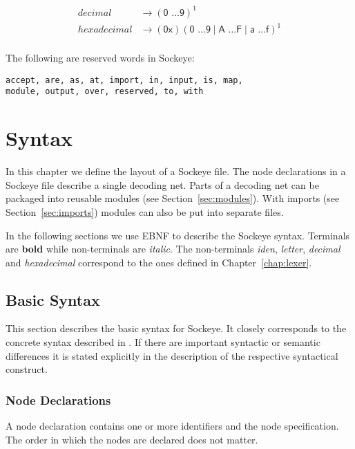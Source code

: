 \documentclass[a4paper,11pt,twoside]{report}
\begin{document}
{{{\begin{description}
\begin{align*}
decimal & \rightarrow (\textsf{0 \ldots 9})^{\textrm{1}}\\
hexadecimal & \rightarrow (\textsf{0x})(\textsf{0 \ldots 9} \mid \textsf{A \ldots F} \mid \textsf{a \ldots f})^{\textrm{1}}\\
\end{align*}

\item[Reserved words:] The following are reserved words in Sockeye:
\begin{verbatim}
accept, are, as, at, import, in, input, is, map,
module, output, over, reserved, to, with
\end{verbatim}

\end{description}


\chapter{Syntax}
\label{chap:declaration}

In this chapter we define the layout of a Sockeye file.
The node declarations in a Sockeye file describe a single decoding net.
Parts of a decoding net can be packaged into reusable modules (see Section~\ref{sec:modules}).
With imports (see Section~\ref{sec:imports}) modules can also be put into separate files.

In the following sections we use EBNF to describe the Sockeye syntax. Terminals are \textbf{bold} while non-terminals are \textit{italic}.
The non-terminals \textit{iden}, \textit{letter}, \textit{decimal} and \textit{hexadecimal} correspond to the ones defined in Chapter~\ref{chap:lexer}.

\section{Basic Syntax}
This section describes the basic syntax for Sockeye.
It closely corresponds to the concrete syntax described in \cite{achermann:mars17}.
If there are important syntactic or semantic differences it is stated explicitly in the description of the respective syntactical construct.

\subsection{Node Declarations}
A node declaration contains one or more identifiers and the node specification.
The order in which the nodes are declared does not matter.

}}}
\end{document}
